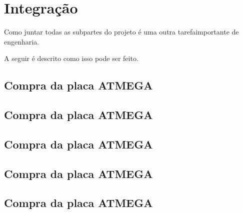 \chapter{Integração}\label{CAP:integracao}

\label{CAP8}

Como juntar todas as subpartes do projeto é uma outra tarefaimportante de engenharia.

A seguir é descrito como isso pode ser feito.

\section{Compra da placa ATMEGA}
\section{Compra da placa ATMEGA}
\section{Compra da placa ATMEGA}
\section{Compra da placa ATMEGA}
\section{Compra da placa ATMEGA}